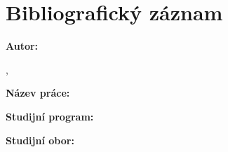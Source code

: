 {  \section*{Bibliografický záznam}
  \noindent
  \begin{minipage}[t]{0.25\textwidth}\vspace{0pt}%
    \doccol \textbf{Autor:}
  \end{minipage}
  \hspace{0.05\textwidth}
  \begin{minipage}[t]{0.7\textwidth}\vspace{0pt}%
    \@author, \par
    \@AuthorAffCZE
  \end{minipage} \par
  \vspace{0.5cm}
  \noindent
  \begin{minipage}[t]{0.25\textwidth}\vspace{0pt}%
    \doccol \textbf{Název práce:}
  \end{minipage}
  \hspace{0.05\textwidth}
  \begin{minipage}[t]{0.7\textwidth}\vspace{0pt}%
    \textbf{\@TitleCZE}
  \end{minipage} \par
  \vspace{0.5cm}
  \noindent
  \begin{minipage}[t]{0.25\textwidth}\vspace{0pt}%
    \doccol \textbf{Studijní program:}
  \end{minipage}
  \hspace{0.05\textwidth}
  \begin{minipage}[t]{0.7\textwidth}\vspace{0pt}%
    \@DegreeProgrammeCZE
  \end{minipage} \par
  \vspace{0.5cm}
  \noindent
  \begin{minipage}[t]{0.25\textwidth}\vspace{0pt}%
    \doccol \textbf{Studijní obor:}
  \end{minipage}
  \hspace{0.05\textwidth}
  \begin{minipage}[t]{0.7\textwidth}\vspace{0pt}%
    \@FieldCZE
  \end{minipage} \par
}
